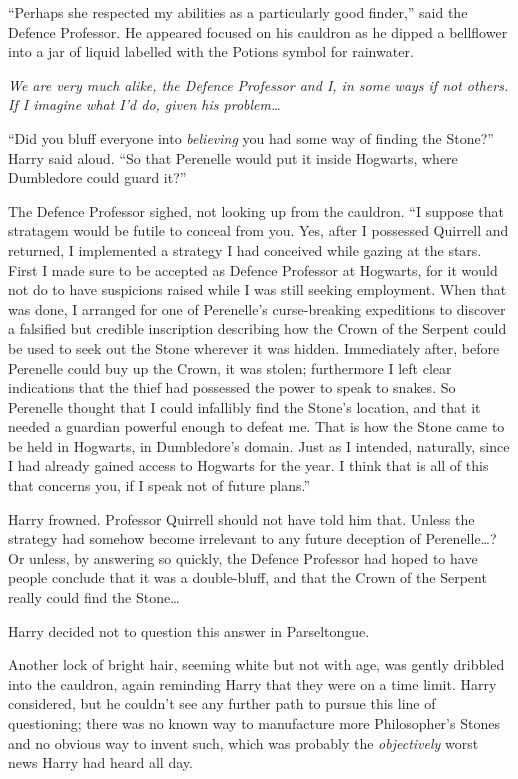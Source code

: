 “Perhaps she respected my abilities as a particularly good finder,” said the Defence Professor. He appeared focused on his cauldron as he dipped a bellflower into a jar of liquid labelled with the Potions symbol for rainwater.

\emph{We are very much alike, the Defence Professor and I, in some ways if not others. If I imagine what I’d do, given his problem…}

“Did you bluff everyone into \emph{believing} you had some way of finding the Stone?” Harry said aloud. “So that Perenelle would put it inside Hogwarts, where Dumbledore could guard it?”

The Defence Professor sighed, not looking up from the cauldron. “I suppose that stratagem would be futile to conceal from you. Yes, after I possessed Quirrell and returned, I implemented a strategy I had conceived while gazing at the stars. First I made sure to be accepted as Defence Professor at Hogwarts, for it would not do to have suspicions raised while I was still seeking employment. When that was done, I arranged for one of Perenelle’s curse-breaking expeditions to discover a falsified but credible inscription describing how the Crown of the Serpent could be used to seek out the Stone wherever it was hidden. Immediately after, before Perenelle could buy up the Crown, it was stolen; furthermore I left clear indications that the thief had possessed the power to speak to snakes. So Perenelle thought that I could infallibly find the Stone’s location, and that it needed a guardian powerful enough to defeat me. That is how the Stone came to be held in Hogwarts, in Dumbledore’s domain. Just as I intended, naturally, since I had already gained access to Hogwarts for the year. I think that is all of this that concerns you, if I speak not of future plans.”

Harry frowned. Professor Quirrell should not have told him that. Unless the strategy had somehow become irrelevant to any future deception of Perenelle…? Or unless, by answering so quickly, the Defence Professor had hoped to have people conclude that it was a double-bluff, and that the Crown of the Serpent really could find the Stone…

Harry decided not to question this answer in Parseltongue.

Another lock of bright hair, seeming white but not with age, was gently dribbled into the cauldron, again reminding Harry that they were on a time limit. Harry considered, but he couldn’t see any further path to pursue this line of questioning; there was no known way to manufacture more Philosopher’s Stones and no obvious way to invent such, which was probably the \emph{objectively} worst news Harry had heard all day.

